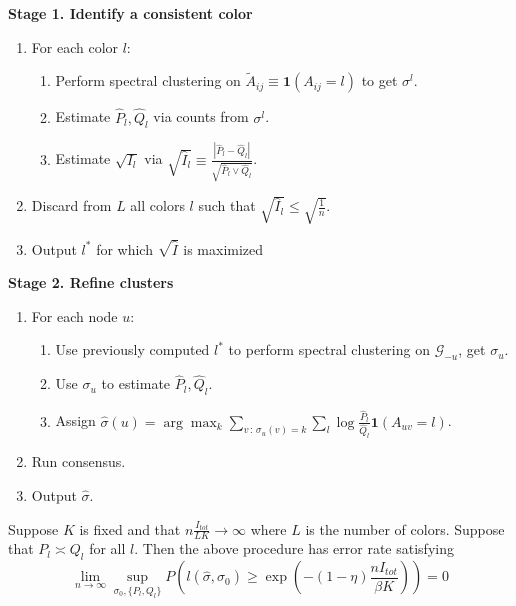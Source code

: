 \documentclass{article}
\begin{document}
\textbf{Stage 1. Identify a consistent color}
\begin{enumerate}
\item For each color $l$:
  \begin{enumerate}
   \item Perform spectral clustering on $\tilde{A}_{ij} \equiv \mathbf{1}(A_{ij} = l)$ to get $\sigma^l$.
   \item Estimate $\hat{P}_l, \hat{Q}_l$ via counts from $\sigma^l$. 
   \item Estimate $\sqrt{I_l}$ via 
  $\sqrt{ \hat{I}_l } \equiv \frac{| \hat{P}_l - \hat{Q}_l |}{\sqrt{ \hat{P}_l \vee \hat{Q}_l}}$. 
   \end{enumerate}
\item Discard from $L$ all colors $l$ such that $\sqrt{\hat{I}_l} \leq \sqrt{ \frac{1}{n}}$.
\item Output $l^*$ for which $\sqrt{\hat{I}}$ is maximized
\end{enumerate}

 \textbf{Stage 2. Refine clusters}
\begin{enumerate}
\item For each node $u$:
  \begin{enumerate}
  \item Use previously computed $l^*$ to perform spectral clustering on $\mathcal{G}_{-u}$, get $\sigma_u$.
   \item Use $\sigma_u$ to estimate $\hat{P}_l, \hat{Q}_l$.
   \item Assign $\hat{\sigma}(u) = \arg\max_k \sum_{v \,:\, \sigma_u(v) = k} \sum_l 
                  \log \frac{\hat{P}_l}{\hat{Q}_l} \mathbf{1}(A_{uv} = l) $. 
   \end{enumerate}

\item Run consensus. 

\item Output $\hat{\sigma}$. 

\end{enumerate}

\begin{proposition}
\label{prop:rate_optimal}
Suppose $K$ is fixed and that $n \frac{I_{tot}}{L K} \rightarrow \infty$ where $L$ is the number of colors. Suppose that $P_l \asymp Q_l$ for all $l$. Then the above procedure has error rate satisfying
\[
\lim_{n \rightarrow \infty}  \sup_{\sigma_0, \{P_l, Q_l\}} P \left( l(\hat{\sigma}, \sigma_0) \geq \exp\left( - (1 - \eta) \frac{ n I_{tot}}{\beta K} \right) \right) = 0
\]
\end{proposition}
\end{document}
